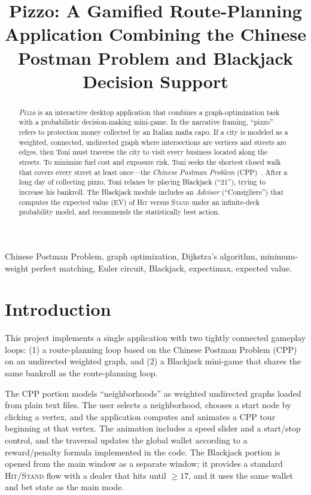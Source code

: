 \documentclass[conference]{IEEEtran}
\title{Pizzo: A Gamified Route-Planning Application Combining the Chinese Postman Problem and Blackjack Decision Support}
\author{
\IEEEauthorblockN{Tarik Agi\'c}
\IEEEauthorblockA{
Faculty of Electrical Engineering, University of Sarajevo\\
Sarajevo, Bosnia and Herzegovina\\
Student ID: 20108\\
Course: Artificial Intelligence
}
}
\begin{document}
\maketitle

\begin{abstract}
\emph{Pizzo} is an interactive desktop application that combines a graph-optimization task with a probabilistic decision-making mini-game.
In the narrative framing, ``pizzo'' refers to protection money collected by an Italian mafia capo.
If a city is modeled as a weighted, connected, undirected graph where intersections are vertices and streets are edges, then Toni must traverse the city to visit every business located along the streets.
To minimize fuel cost and exposure risk, Toni seeks the shortest closed walk that covers every street at least once---the \emph{Chinese Postman Problem} (CPP)~\cite{ref_mit_urban}.
After a long day of collecting pizzo, Toni relaxes by playing Blackjack (``21''), trying to increase his bankroll.
The Blackjack module includes an \emph{Advisor} (``Consigliere'') that computes the expected value (EV) of \textsc{Hit} versus \textsc{Stand} under an infinite-deck probability model, and recommends the statistically best action.
\end{abstract}

\begin{IEEEkeywords}
Chinese Postman Problem, graph optimization, Dijkstra's algorithm, minimum-weight perfect matching, Euler circuit, Blackjack, expectimax, expected value.
\end{IEEEkeywords}

\section{Introduction}
This project implements a single application with two tightly connected gameplay loops:
(1) a route-planning loop based on the Chinese Postman Problem (CPP) on an undirected weighted graph, and
(2) a Blackjack mini-game that shares the same bankroll as the route-planning loop.

The CPP portion models ``neighborhoods'' as weighted undirected graphs loaded from plain text files.
The user selects a neighborhood, chooses a start node by clicking a vertex, and the application computes and animates a CPP tour beginning at that vertex.
The animation includes a speed slider and a start/stop control, and the traversal updates the global wallet according to a reward/penalty formula implemented in the code.
The Blackjack portion is opened from the main window as a separate window; it provides a standard \textsc{Hit}/\textsc{Stand} flow with a dealer that hits until $\ge 17$, and it uses the same wallet and bet state as the main mode.
\end{document}
